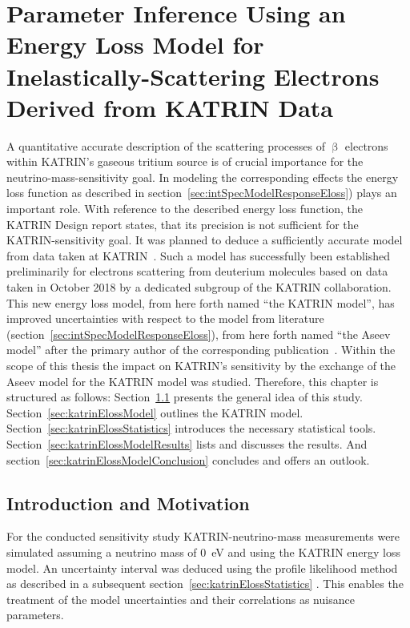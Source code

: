 \def\currentRootFolder{chapter/sensitivityStudyWithPreliminaryKatrinElossModel}
\def\currentFigureFolder{\currentRootFolder/fig}

\chapter{Parameter Inference Using an Energy Loss Model for Inelastically-Scattering Electrons Derived from KATRIN Data}
\label{sec:katrinEloss}
A quantitative accurate description of the scattering processes of $\upbeta$ electrons within KATRIN's gaseous tritium source is of crucial importance for the neutrino-mass-sensitivity goal. In modeling the corresponding effects the energy loss function as described in section~\ref{sec:intSpecModelResponseEloss}) plays an important role. With reference to the described energy loss function, the KATRIN Design report states, that its precision is not sufficient for the KATRIN-sensitivity goal. It was planned to deduce a sufficiently accurate model from data taken at KATRIN~\cite{Angrik:2005ep}. Such a model has successfully been established preliminarily for electrons scattering from deuterium molecules based on data taken in October 2018 by a dedicated subgroup of the KATRIN collaboration. This new energy loss model, from here forth named ``the KATRIN model'', has improved uncertainties with respect to the model from literature (section~\ref{sec:intSpecModelResponseEloss}), from here forth named ``the Aseev model'' after the primary author of the corresponding publication~\cite{Aseev2000}. Within the scope of this thesis the impact on KATRIN's sensitivity by the exchange of the Aseev model for the KATRIN model was studied. Therefore, this chapter is structured as follows: Section~\ref{sec:katrinElossConcept} presents the general idea of this study. Section~\ref{sec:katrinElossModel} outlines the KATRIN model. Section~\ref{sec:katrinElossStatistics} introduces the necessary statistical tools. Section~\ref{sec:katrinElossModelResults} lists and discusses the results. And section~\ref{sec:katrinElossModelConclusion} concludes and offers an outlook.

\section{Introduction and Motivation}
\label{sec:katrinElossConcept}
For the conducted sensitivity study KATRIN-neutrino-mass measurements were simulated assuming a neutrino mass of \SI{0}{eV} and using the KATRIN energy loss model. An uncertainty interval was deduced using the profile likelihood method as described in a subsequent section~\ref{sec:katrinElossStatistics} . This enables the treatment of the model uncertainties and their correlations as nuisance parameters.

